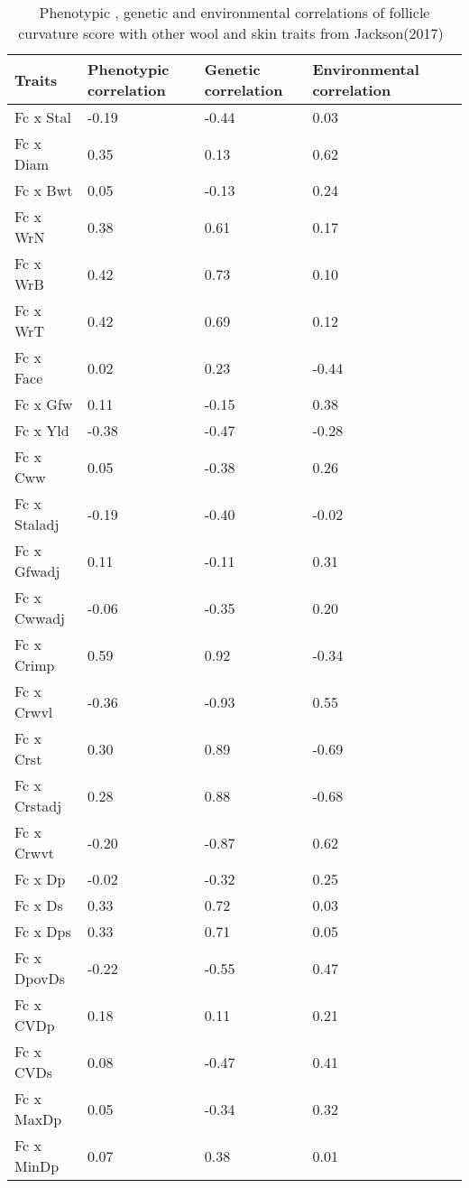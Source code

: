 %

\begin{table}[h]
\scriptsize
\centering
\caption{Phenotypic , genetic and environmental correlations of follicle curvature score with other wool and skin traits from Jackson(2017)~\cite{jackson-2017a}}
\label{tab:ab32}
\vspace{0.01in}
\begin{tabular}{|p{1.2in}|p{0.8in}|p{0.8in}|p{0.8in}|p{0.8in}|}  \hline
  Traits  & Phenotypic correlation  & Genetic correlation & Environmental correlation  \\  \hline
 Fc x Stal  & -0.19 & -0.44 & 0.03  \\
 Fc x Diam  & 0.35 & 0.13 & 0.62 \\
 Fc x Bwt  & 0.05 & -0.13 & 0.24 \\
 Fc x WrN & 0.38 & 0.61 & 0.17 \\ 
 Fc x WrB & 0.42 & 0.73 & 0.10 \\
 Fc x WrT & 0.42 & 0.69 & 0.12 \\
 Fc x Face & 0.02 & 0.23 & -0.44 \\
 Fc x Gfw & 0.11 & -0.15 & 0.38 \\
 Fc x Yld & -0.38 & -0.47 & -0.28 \\
 Fc x Cww & 0.05 & -0.38 & 0.26 \\
 Fc x Staladj & -0.19 & -0.40 & -0.02 \\
 Fc x Gfwadj & 0.11 & -0.11 & 0.31 \\
 Fc x Cwwadj & -0.06 & -0.35 & 0.20 \\
 Fc x Crimp & 0.59 & 0.92 & -0.34 \\
 Fc x Crwvl & -0.36 & -0.93 & 0.55 \\
 Fc x Crst & 0.30 & 0.89 & -0.69 \\
 Fc x Crstadj & 0.28 & 0.88 & -0.68 \\
 Fc x Crwvt & -0.20 & -0.87 & 0.62 \\
 Fc x Dp & -0.02 & -0.32 & 0.25 \\
 Fc x Ds & 0.33 & 0.72 & 0.03 \\
 Fc x Dps & 0.33 & 0.71 & 0.05 \\
 Fc x DpovDs & -0.22 & -0.55 & 0.47 \\
 Fc x CVDp & 0.18 & 0.11 & 0.21 \\
 Fc x CVDs & 0.08 & -0.47 & 0.41 \\
 Fc x MaxDp & 0.05 & -0.34 & 0.32 \\
 Fc x MinDp & 0.07 & 0.38 & 0.01 \\

\end{tabular}
\end{table}
